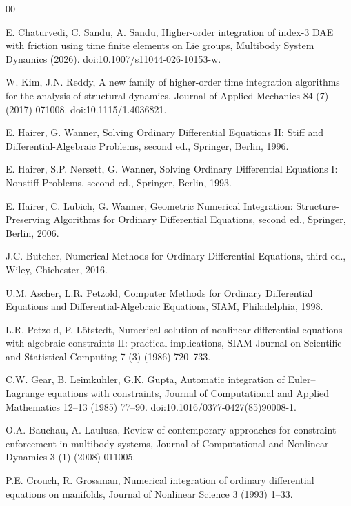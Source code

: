\documentclass[preprint,12pt]{elsarticle}
\begin{document}
\begin{thebibliography}{00}

E. Chaturvedi, C. Sandu, A. Sandu,
Higher-order integration of index-3 DAE with friction using time finite elements on Lie groups,
Multibody System Dynamics (2026).
doi:10.1007/s11044-026-10153-w.

W. Kim, J.N. Reddy,
A new family of higher-order time integration algorithms for the analysis of structural dynamics,
Journal of Applied Mechanics 84 (7) (2017) 071008.
doi:10.1115/1.4036821.

E. Hairer, G. Wanner,
Solving Ordinary Differential Equations II: Stiff and Differential-Algebraic Problems,
second ed., Springer, Berlin, 1996.

E. Hairer, S.P. N{\o}rsett, G. Wanner,
Solving Ordinary Differential Equations I: Nonstiff Problems,
second ed., Springer, Berlin, 1993.

E. Hairer, C. Lubich, G. Wanner,
Geometric Numerical Integration: Structure-Preserving Algorithms for Ordinary Differential
Equations, second ed., Springer, Berlin, 2006.

J.C. Butcher,
Numerical Methods for Ordinary Differential Equations, third ed., Wiley, Chichester, 2016.

U.M. Ascher, L.R. Petzold,
Computer Methods for Ordinary Differential Equations and Differential-Algebraic Equations,
SIAM, Philadelphia, 1998.

L.R. Petzold, P. L\"otstedt,
Numerical solution of nonlinear differential equations with algebraic constraints II: practical
implications,
SIAM Journal on Scientific and Statistical Computing 7 (3) (1986) 720--733.

C.W. Gear, B. Leimkuhler, G.K. Gupta,
Automatic integration of Euler--Lagrange equations with constraints,
Journal of Computational and Applied Mathematics 12--13 (1985) 77--90.
doi:10.1016/0377-0427(85)90008-1.

O.A. Bauchau, A. Laulusa,
Review of contemporary approaches for constraint enforcement in multibody systems,
Journal of Computational and Nonlinear Dynamics 3 (1) (2008) 011005.

P.E. Crouch, R. Grossman,
Numerical integration of ordinary differential equations on manifolds,
Journal of Nonlinear Science 3 (1993) 1--33.


\end{thebibliography}
\end{document}

